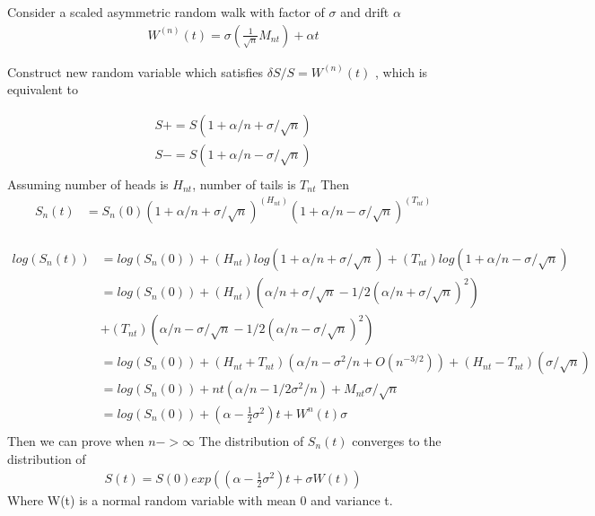 \documentclass[a4paper]{article}
\begin{document}
Consider a scaled asymmetric random walk with factor of $\sigma$ and drift $\alpha$
  \begin{align*}
	W^{(n)}(t) =  \sigma  (\frac{1}{\sqrt{n}} M_{nt} )+ \alpha t
  \end{align*}
  
  Construct new random variable which satisfies
  $\delta S / S = W^{(n)}(t)$ , which is equivalent to 
	
	\begin{align*}
  S+ = S(1+\alpha /n + \sigma /\sqrt{n}) \\
  S- =  S(1+\alpha /n - \sigma /\sqrt{n}) \\
	\end{align*}
  Assuming number of heads is $H_{nt}$, number of tails is $T_{nt}$
  Then 
  \begin{align*}
	 S_n(t) &= S_n(0) (1+\alpha /n + \sigma /\sqrt{n})^{(H_{nt})} (1+\alpha /n - \sigma /\sqrt{n})^{(T_{nt})} \\
   \end{align*}
 
 \begin{align*}
	log(S_n(t)) & = log(S_n(0)) + (H_{nt}) log(1+\alpha /n + \sigma /\sqrt{n})
								+ (T_{nt}) log(1+\alpha /n - \sigma /\sqrt{n})\\
				& = log(S_n(0)) + (H_{nt}) (\alpha /n + \sigma /\sqrt{n} - 1/2(\alpha /n + \sigma /\sqrt{n})^2)\\
				& +(T_{nt}) (\alpha /n - \sigma /\sqrt{n} - 1/2(\alpha /n - \sigma /\sqrt{n})^2)\\
				& = log(S_n(0)) +(H_{nt} + T_{nt}) (\alpha/n - \sigma^2 /n + O(n^{-3/2}))
				+ (H_{nt} - T_{nt}) (\sigma /\sqrt{n} )\\
				& = log(S_n(0)) + nt(\alpha /n - 1/2 \sigma^2 /n) + M_{nt} \sigma/\sqrt{n}\\
				& = log(S_n(0)) + (\alpha - \frac{1}{2} \sigma^2)t + W^{n}(t) \sigma \\
\end{align*}
  Then we can prove when $n-> \infty$
  The distribution of $S_n(t)$ converges to the distribution of
  \begin{align*}
	  S(t) = S(0) exp((\alpha - \frac{1}{2} \sigma^2 )t +\sigma W(t))
  \end{align*}
  Where W(t) is a normal random variable with mean 0 and variance t. 
\end{document}
